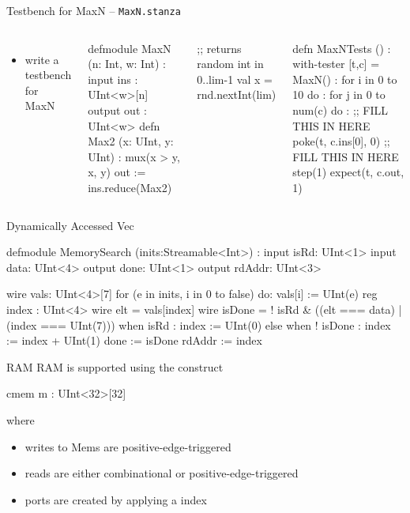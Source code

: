 \documentclass[xcolor=pdflatex,dvipsnames,table]{beamer}
\begin{document}
\begin{frame}[fragile]{Testbench for MaxN -- \tt MaxN.stanza}
\begin{columns}

\begin{itemize}
\item write a testbench for MaxN
\end{itemize}

{
\begin{stanza}
defmodule MaxN (n: Int, w: Int) :
  input ins : UInt<w>[n]
  output out : UInt<w>
  defn Max2 (x: UInt, y: UInt) :
    mux(x > y, x, y)
  out := ins.reduce(Max2)
\end{stanza}
}
\begin{stanza}
;; returns random int in 0..lim-1
val x = rnd.nextInt(lim) 
\end{stanza}


{
\begin{stanza}
defn MaxNTests () :
  with-tester [t,c] = MaxN() :
    for i in 0 to 10 do :
      for j in 0 to num(c) do :
        ;; FILL THIS IN HERE
        poke(t, c.ins[0], 0)
      ;; FILL THIS IN HERE
      step(1)
      expect(t, c.out, 1)
\end{stanza}
}
\end{columns}
\end{frame}

\begin{frame}[fragile]{Dynamically Accessed Vec}
\begin{stanza}
defmodule MemorySearch (inits:Streamable<Int>) :
  input  isRd:   UInt<1>
  input  data:   UInt<4>
  output done:   UInt<1>
  output rdAddr: UInt<3>

  wire vals: UInt<4>[7]
  for (e in inits, i in 0 to false) do:
    vals[i] := UInt(e)
  reg index : UInt<4>
  wire elt    = vals[index]
  wire isDone = ! isRd & ((elt === data) | (index === UInt(7)))
  when isRd :
    index := UInt(0)
  else when ! isDone :
    index := index + UInt(1)
  done    := isDone
  rdAddr  := index
\end{stanza}
\end{frame}

\begin{frame}[fragile]{RAM}
RAM is supported using the  construct

\begin{stanza}
cmem m : UInt<32>[32]
\end{stanza}

\noindent
where
\begin{itemize}
\item writes to Mems are positive-edge-triggered
\item reads are either combinational or positive-edge-triggered
\item ports are created by applying a  index
\end{itemize}
\end{frame}
\end{document}
